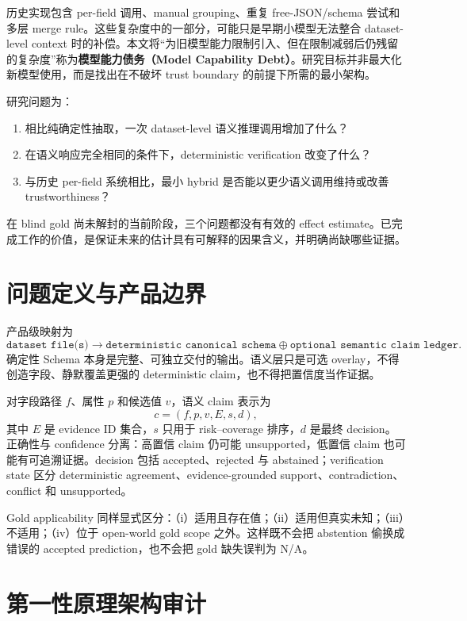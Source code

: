 \documentclass[UTF8,fontset=fandol,11pt]{ctexart}
\newcommand{\NA}{\textsf{N/A}}
\begin{document}
历史实现包含 per-field 调用、manual grouping、重复 free-JSON/schema 尝试和多层 merge rule。这些复杂度中的一部分，可能只是早期小模型无法整合 dataset-level context 时的补偿。本文将“为旧模型能力限制引入、但在限制减弱后仍残留的复杂度”称为\textbf{模型能力债务（Model Capability Debt）}。研究目标并非最大化新模型使用，而是找出在不破坏 trust boundary 的前提下所需的最小架构。

研究问题为：
\begin{enumerate}[label=\textbf{RQ\arabic*:},leftmargin=2.2cm]
  \item 相比纯确定性抽取，一次 dataset-level 语义推理调用增加了什么？
  \item 在语义响应完全相同的条件下，deterministic verification 改变了什么？
  \item 与历史 per-field 系统相比，最小 hybrid 是否能以更少语义调用维持或改善 trustworthiness？
\end{enumerate}

在 blind gold 尚未解封的当前阶段，三个问题都没有有效的 effect estimate。已完成工作的价值，是保证未来的估计具有可解释的因果含义，并明确尚缺哪些证据。

\section{问题定义与产品边界}

产品级映射为
\[
  \texttt{dataset file(s)} \longrightarrow
  \texttt{deterministic canonical schema} \oplus
  \texttt{optional semantic claim ledger}.
\]
确定性 Schema 本身是完整、可独立交付的输出。语义层只是可选 overlay，不得创造字段、静默覆盖更强的 deterministic claim，也不得把置信度当作证据。

对字段路径 $f$、属性 $p$ 和候选值 $v$，语义 claim 表示为
\[
  c=(f,p,v,E,s,d),
\]
其中 $E$ 是 evidence ID 集合，$s$ 只用于 risk--coverage 排序，$d$ 是最终 decision。正确性与 confidence 分离：高置信 claim 仍可能 unsupported，低置信 claim 也可能有可追溯证据。decision 包括 accepted、rejected 与 abstained；verification state 区分 deterministic agreement、evidence-grounded support、contradiction、conflict 和 unsupported。

Gold applicability 同样显式区分：（i）适用且存在值；（ii）适用但真实未知；（iii）不适用；（iv）位于 open-world gold scope 之外。这样既不会把 abstention 偷换成错误的 accepted prediction，也不会把 gold 缺失误判为 \NA。

\section{第一性原理架构审计}
\end{document}
